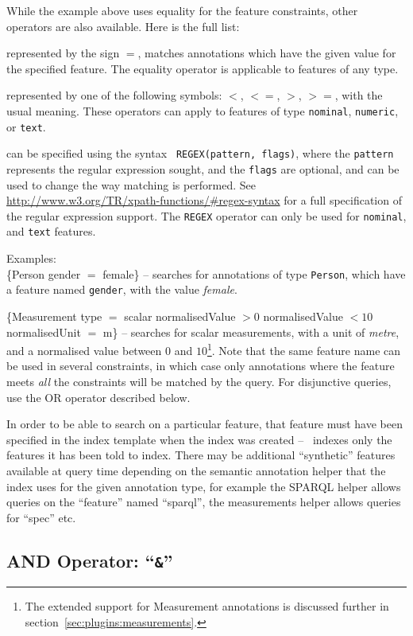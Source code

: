 While the example above uses equality for the feature constraints, other
operators are also available. Here is the full list:
\bde
  \item[equality:] represented by the sign $=$, matches annotations which have
  the given value for the specified feature. The equality operator is
  applicable to features of any type.
  \item[comparison operators:] represented by one of the following symbols:
  $<$, $<=$, $>$, $>=$, with the usual meaning. These operators can apply to
  features of type {\tt nominal}, {\tt numeric}, or {\tt text}.
  \item[regular expressions:] can be specified using the syntax {\tt
  REGEX(pattern, flags)}, where the {\tt pattern} represents the regular
  expression sought, and the {\tt flags} are optional, and can be used to
  change the way matching is performed. See
  \url{http://www.w3.org/TR/xpath-functions/#regex-syntax} for a full
  specification of the regular expression support. The {\tt REGEX} operator can
  only be used for {\tt nominal}, and {\tt text} features.
\ede

Examples:\\
\{Person gender $=$ female\} -- searches for annotations of type
{\tt Person}, which have a feature named {\tt gender}, with the value
{\it female}.

\{Measurement type $=$ scalar normalisedValue $>0$ normalisedValue $<10$
normalisedUnit $=$ m\} -- searches for scalar measurements, with a unit of {\it
metre}, and a normalised value between $0$ and $10$\footnote{The extended
support for Measurement annotations is discussed further in
section~\ref{sec:plugins:measurements}.}.  Note that the same feature name
can be used in several constraints, in which case only annotations where the
feature meets {\em all} the constraints will be matched by the query.  For
disjunctive queries, use the OR operator described below.

In order to be able to search on a particular feature, that feature
must have been specified in the index template when the index was created --
\Mimir\ indexes only the features it has been told to index.  There may be
additional ``synthetic'' features available at query time depending on the
semantic annotation helper that the index uses for the given annotation type,
for example the SPARQL helper allows queries on the ``feature'' named
``sparql'', the measurements helper allows queries for ``spec'' etc.

\subsection{AND Operator: ``{\tt \&}''}\label{sec:and-query}

